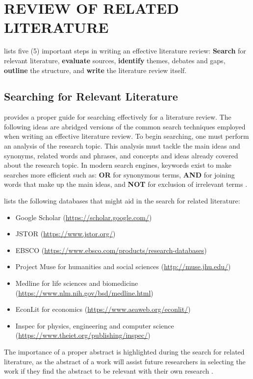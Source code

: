\documentclass{strrespaper-trad}
\begin{document}
	\chapter{REVIEW OF RELATED LITERATURE}
		\textcite{mccombesLiteratureReviewComplete2019} lists five (5) important steps in writing an effective literature review: \textbf{Search} for relevant literature, \textbf{evaluate} sources, \textbf{identify} themes, debates and gaps, \textbf{outline} the structure, and \textbf{write} the literature review itself.

		\section*{Searching for Relevant Literature}
			\textcite{hardyGuidesLiteratureReview2020} provides a proper guide for searching effectively for a literature review.
			The following ideas are abridged versions of the common search techniques employed when writing an effective literature review.
			To begin searching, one must perform an analysis of the research topic.
			This analysis must tackle the main ideas and synonyms, related words and phrases, and concepts and ideas already covered about the research topic.
			In modern search engines, keywords exist to make searches more efficient such as: \textbf{OR} for synonymous terms, \textbf{AND} for joining words that make up the main ideas, and \textbf{NOT} for exclusion of irrelevant terms \autocite{hardyGuidesLiteratureReview2020}.

			\textcite{mccombesLiteratureReviewComplete2019} lists the following databases that might aid in the search for related literature:
			\begin{itemize}
				\item Google Scholar (\url{https://scholar.google.com/})
				\item JSTOR (\url{https://www.jstor.org/})
				\item EBSCO (\url{https://www.ebsco.com/products/research-databases})
				\item Project Muse for humanities and social sciences (\url{http://muse.jhu.edu/})
				\item Medline for life sciences and biomedicine (\url{https://www.nlm.nih.gov/bsd/medline.html})
				\item EconLit for economics (\url{https://www.aeaweb.org/econlit/})
				\item Inspec for physics, engineering and computer science (\url{https://www.theiet.org/publishing/inspec/})
			\end{itemize}
			The importance of a proper abstract is highlighted during the search for related literature, as the abstract of a work will assist future researchers in selecting the work if they find the abstract to be relevant with their own research \autocite{mccombesLiteratureReviewComplete2019}.
\end{document}

